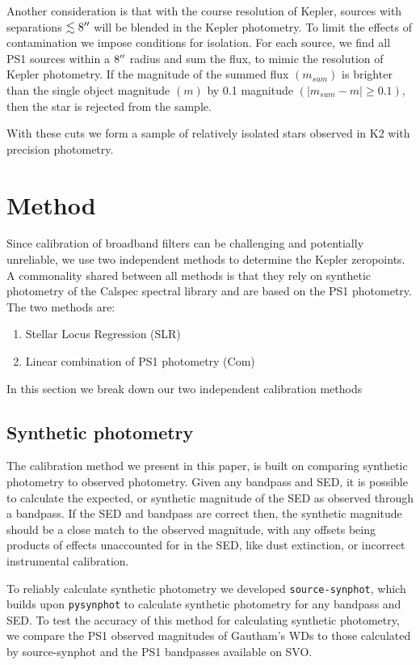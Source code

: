 \documentclass{aastex63}
\newcommand{\rr}[1]{{\bf \color{purple}{#1}}}
\begin{document}
Another consideration is that with the course resolution of Kepler, sources with separations $\lesssim8\mbox{$^{\prime\prime}$}$ will be blended in the Kepler photometry. To limit the effects of contamination we impose conditions for isolation. For each source, we find all PS1 sources within a $8\mbox{$^{\prime\prime}$}$ radius and sum the flux, to mimic the resolution of Kepler photometry. If the magnitude of the summed flux $(m_{sum})$ is brighter than the single object magnitude $(m)$ by 0.1 magnitude $(\left|m_{sum}-m\right| \geq0.1)$, then the star is rejected from the sample.

With these cuts we form a sample of relatively isolated stars observed in K2 with precision photometry. 

\section{Method} \label{sec:method}

Since calibration of broadband filters can be challenging and potentially unreliable, we use two independent methods to determine the Kepler zeropoints. A commonality shared between all methods is that they rely on synthetic photometry of the Calspec spectral library and are based on the PS1 photometry. The two methods are:
\begin{enumerate}
    \item Stellar Locus Regression (SLR)
    \item Linear combination of PS1 photometry (Com)
\end{enumerate}

In this section we break down our two independent calibration methods 

\subsection{Synthetic photometry} \label{sec:synphot}
\rr{maybe move this to the PS1 error paper?}
The calibration method we present in this paper, is built on comparing synthetic photometry to observed photometry. Given any bandpass and SED, it is possible to calculate the expected, or synthetic magnitude of the SED as observed through a bandpass. If the SED and bandpass are correct then, the synthetic magnitude should be a close match to the observed magnitude, with any offsets being products of effects unaccounted for in the SED, like dust extinction, or incorrect instrumental calibration. 

To reliably calculate synthetic photometry we developed \texttt{source-synphot}, which builds upon \texttt{pysynphot} to calculate synthetic photometry for any bandpass and SED. To test the accuracy of this method for calculating synthetic photometry, we compare the PS1 observed magnitudes of Gautham's WDs to those calculated by source-synphot and the PS1 bandpasses available on SVO.
\end{document}
